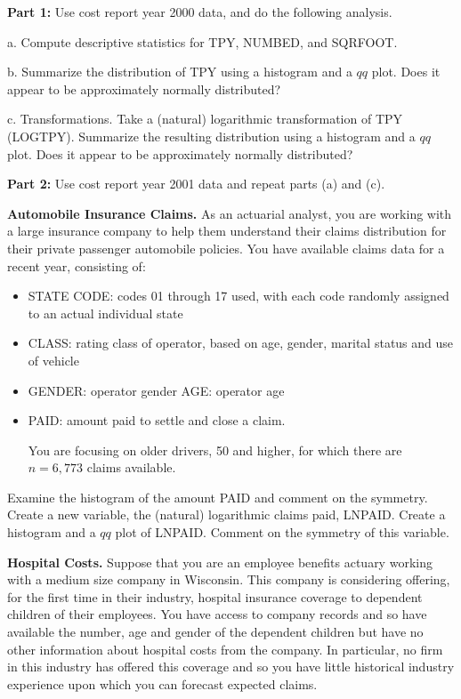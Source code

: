 \begin{exercises}
\textbf{Part 1:} Use cost report year 2000 data, and do the
following analysis.

a. Compute descriptive statistics for TPY, NUMBED, and SQRFOOT.

b. Summarize the distribution of TPY using a histogram and a $qq$
plot. Does it appear to be approximately normally distributed?

c. Transformations. Take a (natural) logarithmic transformation of
TPY (LOGTPY). Summarize the resulting distribution using a histogram
and a $qq$ plot. Does it appear to be approximately normally
distributed?


\textbf{Part 2:} Use cost report year 2001 data and repeat parts (a)
and (c).


\item \textbf{Automobile Insurance Claims.}\label{Ex:AutoClaims} As an actuarial analyst,
you are working with a large insurance company to help them
understand their claims distribution for their private passenger
automobile policies. You have available claims data for a recent
year, consisting of:

\begin{itemize}
\item STATE CODE: codes 01 through 17 used, with each code randomly
assigned to an actual individual state

\item CLASS: rating class of operator, based on age, gender, marital
status and use of vehicle

\item GENDER:  operator gender AGE: operator age

\item PAID: amount paid to settle and close a claim.

You are focusing on older drivers, 50 and higher, for which there
are $n = 6,773$ claims available.

\end{itemize}

Examine the histogram of the amount PAID and comment on the
symmetry. Create a new variable, the (natural) logarithmic claims
paid, LNPAID. Create a histogram and a $qq$ plot of LNPAID. Comment
on the symmetry of this variable.


\item \textbf{Hospital Costs.}\label{Ex:HospExpend} Suppose
that you are an employee benefits actuary working with a medium size
company in Wisconsin. This company is considering offering, for the
first time in their industry, hospital insurance coverage to
dependent children of their employees. You have access to company
records and so have available the number, age and gender of the
dependent children but have no other information about hospital
costs from the company. In particular, no firm in this industry has
offered this coverage and so you have little historical industry
experience upon which you can forecast expected claims.


\end{exercises}
